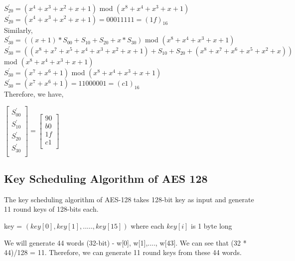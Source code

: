 \documentclass[11pt]{article}
\begin{document}
    \newline
    $S_{20}^{'} = (x^4 + x^3 + x^2 + x + 1)$ mod $(x^8 + x^4 + x^3 + x + 1)$\\
    \newline
    $S_{20}^{'} = (x^4 + x^3 + x^2 + x + 1) = 00011111 = (1f)_{16}$\\
    \newline
Similarly,\\
\newline
    $S_{30}^{'} = ((x+1) * S_{00} + S_{10} + S_{20} + x * S_{30})$ mod $(x^8 + x^4 + x^3 + x + 1)$\\
    \newline
    $S_{30}^{'} = ((x^8 + x^7 + x^5 + x^4 + x^3 + x^2 + x + 1) + S_{10} + S_{20} + (x^8 + x^7 + x^6 + x^5 + x^2 + x))$ mod $(x^8 + x^4 + x^3 + x + 1)$\\
    \newline
    $S_{30}^{'} = (x^7 + x^6 + 1)$ mod $(x^8 + x^4 + x^3 + x + 1)$\\
    \newline
    $S_{30}^{'} = (x^7 + x^6 + 1) = 11000001 = (c1)_{16}$\\
\newline
Therefore, we have,
\begin{center}
    $
    \begin{bmatrix}
        S_{00}^{'}\\
        S_{10}^{'}\\
        S_{20}^{'}\\
        S_{30}^{'}\\
    \end{bmatrix}
    =
    \begin{bmatrix}
        90\\
        b0\\
        1f\\
        c1\\
    \end{bmatrix}
    $
\end{center}

\subsection{Key Scheduling Algorithm of AES 128}
The key scheduling algorithm of AES-128 takes 128-bit key as input and generate 11 round keys of 128-bits each.
\begin{center}
    key = $(key[0], key[1],....., key[15])$ where each $key[i]$ is 1 byte long
\end{center}
We will generate 44 words (32-bit) - w[0], w[1],...., w[43]. We can see that (32 * 44)/128 = 11. Therefore, we can generate 11 round keys from these 44 words.\\
\end{document}
